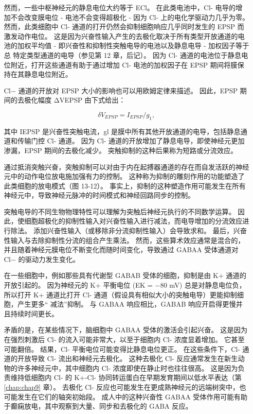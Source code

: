 然而，一些中枢神经元的静息电位大约等于 ECl。 在此类电池中，Cl- 电导的增加不会改变膜电位 - 电池不会变得超极化 - 因为 Cl- 上的电化学驱动力几乎为零。 
然而，此类细胞中 Cl- 通道的打开仍然会抑制细胞响应几乎同时发生的 EPSP 而激发动作电位。 这是因为兴奋性输入产生的去极化取决于所有类型开放通道的电池的加权平均值 - 即兴奋性和抑制性突触电导的电池以及静息电导 - 加权因子等于总 特定类型通道的电导（参见第 12 章，后记）。
因为 Cl- 通道的电池位于静息电位附近，打开这些通道有助于通过增加 Cl- 电池的加权因子在 EPSP 期间将膜保持在其静息电位附近。


Cl− 通道的开放对 EPSP 大小的影响也可以用欧姆定律来描述。
因此，EPSP 期间的去极化幅度 ΔVEPSP 由下式给出：

\begin{equation}\label{depolarization_amplitude}
	\delta V_{EPSP} = I_{EPSP} / g_1,
\end{equation}

其中 IEPSP 是兴奋性突触电流，gl 是膜中所有其他开放通道的电导，包括静息通道和传输门控 Cl- 通道。 因为 Cl- 通道的开放增加了静息电导，即使神经元更加渗漏，EPSP 期间的去极化减少。 
突触抑制的这种后果称为短路或分流效应。


通过抵消突触兴奋，突触抑制可以对由于内在起搏器通道的存在而自发活跃的神经元中的动作电位放电施加强有力的控制。 
这种称为抑制的雕刻作用的功能塑造了此类细胞的放电模式（图 13-12）。 
事实上，抑制的这种塑造作用可能发生在所有神经元中，导致神经元脉冲的时间模式和神经回路同步的控制。


突触电导的不同生物物理特性可以理解为突触后神经元执行的不同数学运算。 
因此，使细胞超极化的抑制性输入对兴奋性输入进行减法，而电导增加的分流效应进行除法。 
添加兴奋性输入（或移除非分流抑制性输入）会导致求和。 
最后，兴奋性输入与去除抑制性分流的组合产生乘法。 
然而，这些算术效应通常是混合的，并且随着神经元膜电位不断变化而随时间变化，导致通过 GABAA 受体通道对 Cl− 的驱动力发生变化。


在一些细胞中，例如那些具有代谢型 GABAB 受体的细胞，抑制是由 K+ 通道的开放引起的。 
因为神经元的 K+ 平衡电位 (EK = −80 mV) 总是对静息电位负，所以打开 K+ 通道比打开 Cl- 通道（假设具有相似大小的突触电导）更能抑制细胞，产生更多“ 减法”抑制。 与 GABAA 响应相比，GABAB 响应开启得更慢并且持续时间更长。


矛盾的是，在某些情况下，脑细胞中 GABAA 受体的激活会引起兴奋。
这是因为在强烈刺激后 Cl- 的流入可能非常大，以至于细胞内 Cl- 浓度显着增加。
它甚至可能翻倍。
结果，Cl- 平衡电位可能变得比静息电位更正。 
在这些条件下，Cl- 通道的开放导致 Cl- 流出和神经元去极化。
这种去极化 Cl- 反应通常发生在新生动物的许多神经元中，其中细胞内 Cl- 浓度即使在静止时也往往很高。 
这是因为负责维持低细胞内 Cl- 的 K+-Cl- 协同转运蛋白在早期发育期间以低水平表达（第 \ref{chap:chap9} 章）。 
去极化 Cl- 反应也可能发生在更成熟神经元的远端树突中，也可能发生在它们的轴突初始段。 
成人中的这种兴奋性 GABAA 受体作用可能有助于癫痫放电，其中观察到大量、同步和去极化的 GABA 反应。



